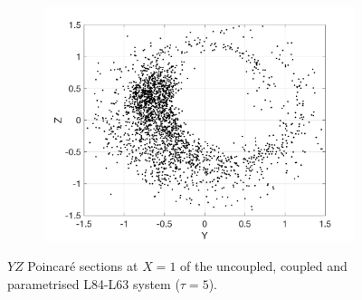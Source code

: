 \documentclass[12pt]{article}
\begin{document}
\begin{figure}[H]
\begin{subfigure}[b]{0.3\textwidth}
		\includegraphics[width=\textwidth]{plots/l84l63/poincare_yz_p5.png}
	\end{subfigure}
	\caption{\label{poincareyz5}$YZ$ Poincar\'e sections at $X=1$ of the uncoupled, coupled and parametrised L84-L63 system ($\tau=5$).}
\end{figure}
\end{document}
